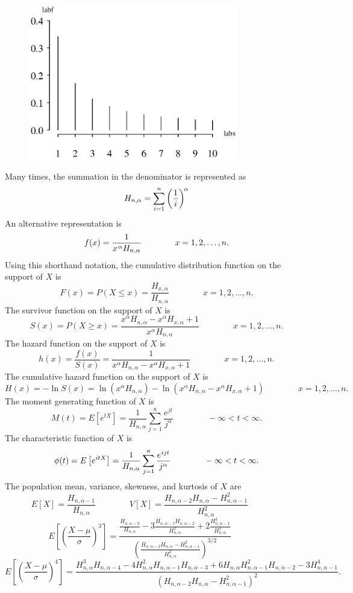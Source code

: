 \documentclass[12pt,fullpage]{article}
\begin{document}
\begin{figure}[h!]
\begin{center}
\includegraphics[width=3.6in]{ZipfPlot.ps}
\end{center}
\end{figure}

\noindent
Many times, the summation in the denominator is represented as
$$
H_{n,\alpha} = \sum _{i=1}^{n} \left( \frac{1}{i}\right) ^{\kern -0.10 em \alpha}
$$
An alternative representation is 
$$
f(x) = {\frac {1}{{x}^{\kern 0.08 em \alpha}H_{n,\alpha}}} \qquad \qquad x = 1, 2, \ldots, n.
$$
Using this shorthand notation, the cumulative distribution function on
the support of $X$ is
$$
F(x) = P(X \le x) = \frac{H_{x, \alpha}}{H_{n, \alpha}}  \qquad \qquad x = 1, 2, \ldots, n.
$$
The survivor function on the support of $X$ is
$$
S(x) = P(X \ge x) = \frac{x^{\alpha} H_{n, \alpha} - x^{\alpha} H_{x, \alpha} + 1}{x^{\alpha}H_{n, \alpha}}  \qquad \qquad x = 1, 2, \ldots, n.
$$
The hazard function on the support of $X$ is
$$
h(x) = \frac{f(x)}{S(x)} = \frac{1}{x^{\alpha}H_{n,\alpha} - x^{\alpha}H_{x,\alpha} + 1} \qquad \qquad x = 1, 2, \ldots, n.
$$
The cumulative hazard function on the support of $X$ is
$$
H(x) = - \ln S(x) = \ln \left(x^{\alpha} H_{n,\alpha}\right) - \ln \left(x^{\alpha}H_{n,\alpha} - x^{\alpha}H_{x,\alpha} + 1\right)  \qquad \qquad x = 1, 2, \ldots, n.
$$
The moment generating function of $X$ is
$$
M(t) = E\left[ e ^ {tX} \right] = \frac{1}{H_{n, \alpha}}\sum_{j=1}^n \frac{e^{jt}}{j^{\alpha}} \qquad \qquad -\infty < t < \infty.
$$
The characteristic function of $X$ is
$$
\phi(t) = E\left[ e ^ {itX} \right] =  \frac{1}{H_{n, \alpha}}\sum_{j=1}^n \frac{e^{\kern 0.04 em ijt}}{j^{\alpha}} \qquad \qquad -\infty < t < \infty.
$$
The population mean, variance, skewness, and kurtosis of $X$ are
$$
E[X] = \frac{H_{n, \alpha - 1}}{H_{n, \alpha}} \qquad \qquad
V[X] = \frac{H_{n, \alpha - 2} H_{n, \alpha} - H_{n, \alpha - 1}^2}{H_{n,\alpha}^2} \qquad \qquad 
$$
$$
E\left[ \left( \frac{X - \mu}{\sigma} \right) ^ 3 \right] = \frac{\frac{H_{n, \alpha - 3}}{H_{n, \alpha}} - 3\frac{H_{n, \alpha - 1}H_{n, \alpha - 2}}
{H_{n, \alpha}^2} + 2\frac{H_{n, \alpha - 1}^3}{H_{n, \alpha}^3}}{\left(\frac{H_{n, \alpha - 2}H_{n, \alpha} - H_{n, \alpha - 1}^2}{H_{n,
\alpha}^2} \right)
^{3/2}} \qquad \qquad 
$$
$$
E\left[ \left( \frac{X - \mu}{\sigma} \right) ^ 4 \right] = \frac{H_{n, \alpha}^3H_{n, \alpha-4} - 4H_{n, \alpha}^2H_{n, \alpha - 1}H_{n, \alpha - 3} + 6H_{n, \alpha}
H_{n, \alpha -1}^2H_{n, \alpha - 2} - 3H_{n, \alpha - 1}^4}{(H_{n, \alpha - 2}H_{n, \alpha} - H_{n, \alpha - 1}^2)^2}.
$$
\end{document}

